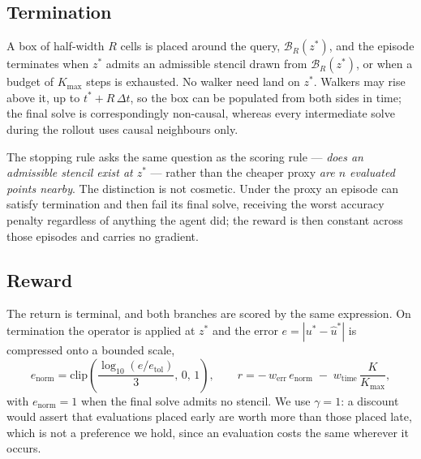 \subsection{Termination}
\label{sec:mdp_term}

A box of half-width $R$ cells is placed around the query,
$\mathcal{B}_R(z^{*})$, and the episode terminates when $z^{*}$ admits an
admissible stencil drawn from $\mathcal{B}_R(z^{*})$, or when a budget of
$K_{\max}$ steps is exhausted. No walker need land on $z^{*}$. Walkers may rise
above it, up to $t^{*} + R\,\Delta t$, so the box can be populated from both
sides in time; the final solve is correspondingly non-causal, whereas every
intermediate solve during the rollout uses causal neighbours only.

The stopping rule asks the same question as the scoring rule --- \emph{does an
admissible stencil exist at $z^{*}$} --- rather than the cheaper proxy
\emph{are $n$ evaluated points nearby}. The distinction is not cosmetic. Under
the proxy an episode can satisfy termination and then fail its final solve,
receiving the worst accuracy penalty regardless of anything the agent did; the
reward is then constant across those episodes and carries no gradient.

\subsection{Reward}
\label{sec:mdp_reward}

The return is terminal, and both branches are scored by the same expression. On
termination the operator is applied at $z^{*}$ and the error
$e = |u^{*} - \hat{u}^{*}|$ is compressed onto a bounded scale,
%
\begin{equation}
  e_{\mathrm{norm}}
  = \mathrm{clip}\!\left(\frac{\log_{10}(e/e_{\mathrm{tol}})}{3},\,0,\,1\right),
  \qquad
  r = -\,w_{\mathrm{err}}\,e_{\mathrm{norm}}
      \;-\; w_{\mathrm{time}}\,\frac{K}{K_{\max}},
  \label{eq:reward}
\end{equation}
%
with $e_{\mathrm{norm}} = 1$ when the final solve admits no stencil. We use
$\gamma = 1$: a discount would assert that evaluations placed early are worth
more than those placed late, which is not a preference we hold, since an
evaluation costs the same wherever it occurs.

